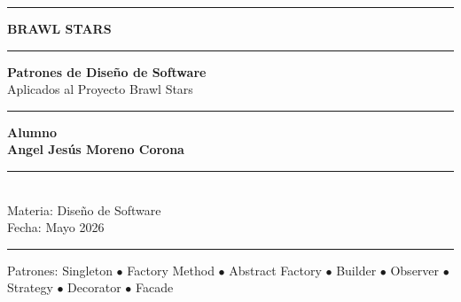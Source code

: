 \documentclass[12pt,a4paper]{article}
\begin{document}
\begin{titlepage}
  \pagecolor{bsDark}
  \color{white}
  \centering
  \vspace*{2cm}

  {\color{bsYellow}\rule{\linewidth}{3pt}}
  \vspace{0.5cm}

  {\fontsize{40}{48}\selectfont\bfseries\color{bsYellow} BRAWL STARS}\\[0.3cm]
  {\color{bsOrange}\rule{\linewidth}{1.5pt}}
  \vspace{0.8cm}

  {\fontsize{22}{28}\selectfont\bfseries Patrones de Dise\~no de Software}\\[0.3cm]
  {\large Aplicados al Proyecto Brawl Stars}\\[0.5cm]

  {\color{bsOrange}\rule{8cm}{1pt}}
  \vspace{1.5cm}

  \begin{tcolorbox}[
    enhanced,
    width=12cm,
    colback=bsDark!80!black,
    colframe=bsYellow,
    arc=5pt,
    boxrule=2pt
  ]
    \centering
    {\Large\bfseries\color{bsYellow} Alumno}\\[0.5cm]
    {\LARGE\bfseries\color{white} Angel Jes\'us Moreno Corona}\\[1cm]
    {\color{bsOrange}\rule{8cm}{0.5pt}}\\[0.5cm]
    {\large\color{gray} Materia:} {\large\color{white} Dise\~no de Software}\\[0.3cm]
    {\large\color{gray} Fecha:} {\large\color{white} Mayo 2026}
  \end{tcolorbox}

  \vfill

  {\color{bsYellow}\rule{\linewidth}{3pt}}
  \vspace{0.3cm}
  {\small\color{gray} Patrones: Singleton $\bullet$ Factory Method $\bullet$ Abstract Factory $\bullet$ Builder $\bullet$ Observer $\bullet$ Strategy $\bullet$ Decorator $\bullet$ Facade}
\end{titlepage}
\pagecolor{white}\color{black}

\newpage
\tableofcontents
\newpage
\end{document}
